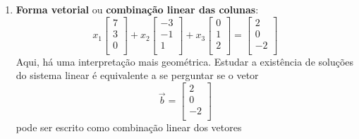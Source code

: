 \begin{enumerate}[1.]
\begin{equation}
\begin{array}{c}
	-2  \\
	\end{array}
	\right]  \quad \text{ ou } \quad A \vec{x} = \vec{b}.
	\end{equation} Nesta forma, aparece o produto de uma matriz por um vetor. Depois podemos considerar produto de matrizes e a resolução de sistemas lineares concomitantemente (ver também capítulo da Semana 04). Caso a matriz $A$ acima seja invertível, sabemos que o sistema possui apenas uma solução e que
	\begin{equation}
	\vec{x} =  A^{-1} \vec{b}.
	\end{equation}
	\item  \textbf{Forma vetorial} ou \textbf{combinação linear das colunas}:
	\begin{equation}
	x_1 \left[
	\begin{array}{ccc}
	7   \\
	3   \\
	0   \\
	\end{array}
	\right] + x_2
	\left[
	\begin{array}{c}
	-3   \\
	-1   \\
	1   \\
	\end{array}
	\right] + x_3
	\left[
	\begin{array}{c}
	0  \\
	1  \\
	2  \\
	\end{array}
	\right] =
	\left[
	\begin{array}{c}
	2  \\
	0  \\
	-2  \\
	\end{array}
	\right]
	\end{equation} Aqui, há uma interpretação mais geométrica. Estudar a existência de soluções do sistema linear é equivalente a se perguntar se o vetor
	\begin{equation}
	\vec{b} =
	\left[
	\begin{array}{c}
	2  \\
	0  \\
	-2  \\
	\end{array}
	\right]
	\end{equation} pode ser escrito como combinação linear dos vetores
	\begin{equation}

\end{equation}
\end{enumerate}
